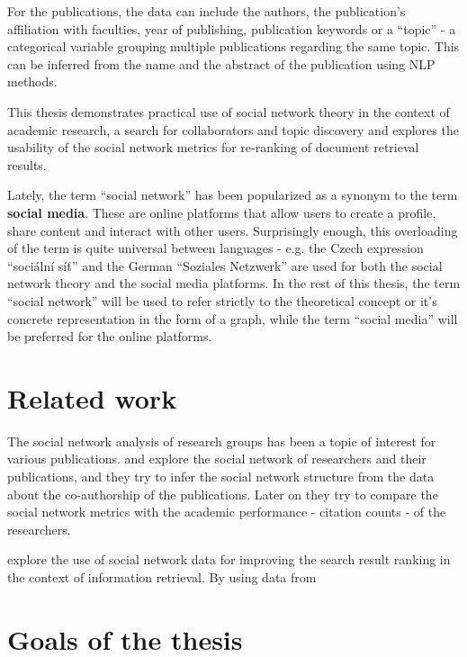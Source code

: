 For the publications, the data can include the authors, the publication's affiliation with faculties, year of publishing, publication keywords or a ``topic'' - a categorical variable grouping multiple publications regarding the same topic. This can be inferred from the name and the abstract of the publication using NLP methods.

This thesis demonstrates practical use of social network theory in the context of academic research, a search for collaborators and topic discovery and explores the usability of the social network metrics for re-ranking of document retrieval results.

Lately, the term ``social network'' has been popularized as a synonym to the term \textbf{social media}.
These are online platforms that allow users to create a profile, share content and interact with other users.
Surprisingly enough, this overloading of the term is quite universal between languages - e.g. the Czech expression ``sociální síť'' and the German ``Soziales Netzwerk'' are used for both the social network theory and the social media platforms.
In the rest of this thesis, the term ``social network'' will be used to refer strictly to the theoretical concept or it's concrete representation in the form of a graph, while the term ``social media'' will be preferred for the online platforms.

\section*{Related work}

The social network analysis of research groups has been a topic of interest for various publications. 
\cite{ORDOOBADI2019S164} and \cite{CIMENLER2014667} explore the social network of researchers and their publications, and they try to infer the 
social network structure from the data about the co-authorship of the publications. 
Later on they try to compare the social network metrics with the academic performance - citation counts - of the researchers.

\cite{inproceedings} explore the use of social network data for improving the search result ranking in the context of information retrieval.
By using data from 

\section*{Goals of the thesis}

